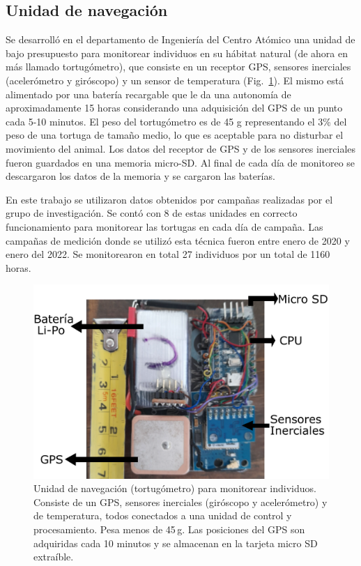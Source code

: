 \subsection{Unidad de navegación}
Se desarrolló en el departamento de Ingeniería del Centro Atómico  una unidad de bajo presupuesto para monitorear individuos en su hábitat natural (de ahora en más llamado tortugómetro), que consiste en un receptor GPS, sensores inerciales (acelerómetro y giróscopo) y un sensor de temperatura (Fig.~\ref{fig:tortugometro}). El mismo está alimentado por una batería recargable que le da una autonomía de aproximadamente 15 horas considerando una adquisición del GPS de un punto cada 5-10 minutos. El peso del tortugómetro es de 45 g representando el 3\% del peso de una tortuga de tamaño medio, lo que es aceptable para no disturbar el movimiento del animal. Los datos del receptor de GPS y de los sensores inerciales fueron guardados en una memoria micro-SD. Al final de cada día de monitoreo se descargaron los datos de la memoria y se cargaron las baterías.
 
En este trabajo se utilizaron datos obtenidos por campañas realizadas por el grupo de investigación. Se contó con 8 de estas unidades en correcto funcionamiento para monitorear las tortugas en cada día de campaña. Las campañas de medición donde se utilizó esta técnica fueron entre enero de 2020 y enero del 2022. Se monitorearon en total 27 individuos por un total de 1160 horas.
\begin{figure}[ht]
    \begin{center}
       
   
    \includegraphics[width=\imsize]{figs/Chap1/tortugometro.pdf}  
\end{center}
    \caption[Unidad de navegación (tortugómetro) para monitorear individuos.] {Unidad de navegación (tortugómetro) para monitorear individuos. Consiste de un GPS, sensores inerciales (giróscopo y acelerómetro) y de temperatura, todos conectados a una unidad de control y procesamiento. Pesa menos de 45\,g. Las posiciones del GPS son adquiridas cada 10 minutos y se almacenan en la tarjeta micro SD extraíble. }
    \label{fig:tortugometro}
\end{figure}
 

